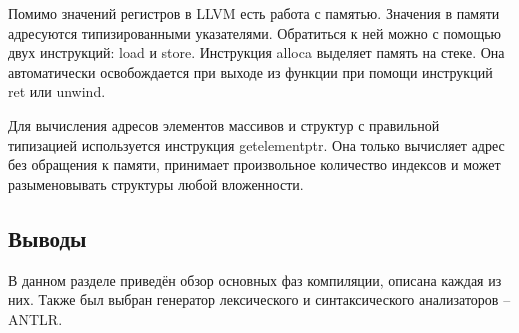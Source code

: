 Помимо значений ­регистров в LLVM есть работа с памятью. Значения в памяти адресуются типизированными указателями. Обратиться к ней можно с помощью двух инструкций: load и store. Инструкция alloca выделяет память на стеке. Она автоматически освобождается при выходе из функции при помощи инструкций ret или unwind.

Для вычисления адресов элементов массивов и структур с правильной типизацией используется инструкция getelementptr. Она только вычисляет
адрес без обращения к памяти, принимает произвольное количество индексов и может разыменовывать структуры любой вложенности. \\

\subsection*{Выводы}
В данном разделе приведён обзор основных фаз компиляции, описана каждая из них. Также был выбран генератор лексического и синтаксического анализаторов -- ANTLR. 

\pagebreak
